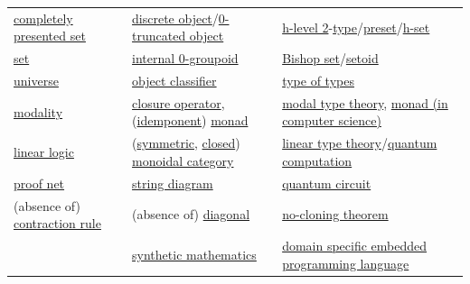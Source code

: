 \documentclass[a4paper,14pt,oneside]{book}
\begin{document}
\begin{longtable}{lll}
\href{https://ncatlab.org/nlab/show/completely+presented+set}{completely presented set} & \href{https://ncatlab.org/nlab/show/discrete+object}{discrete object}/\href{https://ncatlab.org/nlab/show/0-truncated+object}{0-truncated object} & \href{https://ncatlab.org/nlab/show/h-level+2}{h-level 2}-\href{https://ncatlab.org/nlab/show/type}{type}/\href{https://ncatlab.org/nlab/show/preset}{preset}/\href{https://ncatlab.org/nlab/show/h-set}{h-set}\\
\href{https://ncatlab.org/nlab/show/set}{set} & \href{https://ncatlab.org/nlab/show/groupoid+object+in+an+\%28infinity\%2C1\%29-category}{internal 0-groupoid} & \href{https://ncatlab.org/nlab/show/Bishop+set}{Bishop set}/\href{https://ncatlab.org/nlab/show/setoid}{setoid}\\
\href{https://ncatlab.org/nlab/show/universe}{universe} & \href{https://ncatlab.org/nlab/show/object+classifier}{object classifier} & \href{https://ncatlab.org/nlab/show/type+of+types}{type of types}\\
\href{https://ncatlab.org/nlab/show/modality}{modality} & \href{https://ncatlab.org/nlab/show/closure+operator}{closure operator}, (\href{https://ncatlab.org/nlab/show/idempotent+monad}{idemponent}) \href{https://ncatlab.org/nlab/show/monad}{monad} & \href{https://ncatlab.org/nlab/show/modal+type+theory}{modal type theory}, \href{https://ncatlab.org/nlab/show/monad+\%28in+computer+science\%29}{monad (in computer science)}\\
\href{https://ncatlab.org/nlab/show/linear+logic}{linear logic} & (\href{https://ncatlab.org/nlab/show/symmetric+monoidal+category}{symmetric}, \href{https://ncatlab.org/nlab/show/closed+monoidal+category}{closed}) \href{https://ncatlab.org/nlab/show/monoidal+category}{monoidal category} & \href{https://ncatlab.org/nlab/show/linear+type+theory}{linear type theory}/\href{https://ncatlab.org/nlab/show/quantum+computation}{quantum computation}\\
\href{https://ncatlab.org/nlab/show/proof+net}{proof net} & \href{https://ncatlab.org/nlab/show/string+diagram}{string diagram} & \href{https://ncatlab.org/nlab/show/quantum+circuit}{quantum circuit}\\
(absence of) \href{https://ncatlab.org/nlab/show/contraction+rule}{contraction rule} & (absence of) \href{https://ncatlab.org/nlab/show/diagonal}{diagonal} & \href{https://ncatlab.org/nlab/show/no-cloning+theorem}{no-cloning theorem}\\
 & \href{https://ncatlab.org/nlab/show/synthetic+mathematics}{synthetic mathematics} & \href{https://ncatlab.org/nlab/show/domain+specific+embedded+programming+language}{domain specific embedded programming language}\\
\end{longtable}
\end{document}
